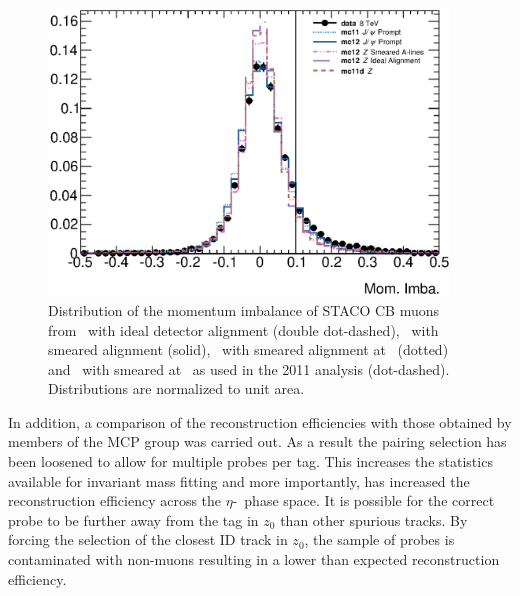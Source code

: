 \begin{figure}[htbp]
  \centering
  \includegraphics[width=0.95\textwidth]{PartCalibration2012/Plots/FixingMomImba/h_muon_momImba.eps}
  \caption{Distribution of the momentum imbalance of STACO CB muons from \ZMu\ with ideal detector alignment (double dot-dashed), \ZMu\ with smeared alignment (solid), \JMu\ with smeared alignment at \cmsE\ (dotted) and \JMu\ with smeared at \cmsS\ as used in the 2011 analysis (dot-dashed). Distributions are normalized to unit area.}
  \label{fig:CalibrationMomImba}
\end{figure}

In addition, a comparison of the reconstruction efficiencies with those obtained by members of the MCP group was carried out. As a result the pairing selection has been loosened to allow for multiple probes per tag. This increases the statistics available for invariant mass fitting and more importantly, has increased the reconstruction efficiency across the $\eta$-\pt\ phase space. It is possible for the correct probe to be further away from the tag in $z_{0}$ than other spurious tracks. By forcing the selection of the closest ID track in $z_{0}$, the sample of probes is contaminated with non-muons resulting in a lower than expected reconstruction efficiency. 

